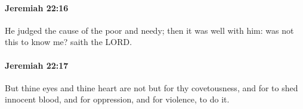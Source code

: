 		\paragraph{Jeremiah 22:16} %
			\label{JEREMIAH-22-16}

			He judged the cause of the poor and needy; then it was well with him: was not this to know me? saith the LORD.


		\paragraph{Jeremiah 22:17} %
			\label{JEREMIAH-22-17}

			But thine eyes and thine heart are not but for thy covetousness, and for to shed innocent blood, and for oppression, and for violence, to do it.


